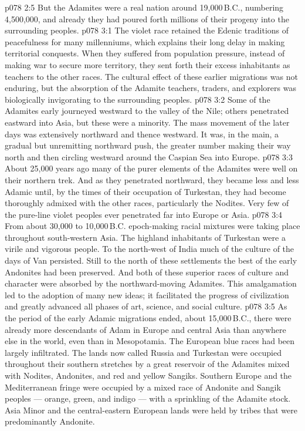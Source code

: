 \vs p078 2:5 But the Adamites were a real nation around 19,000\,B.C., numbering 4,500,000, and already they had poured forth millions of their progeny into the surrounding peoples.
\vs p078 3:1 The violet race retained the Edenic traditions of peacefulness for many millenniums, which explains their long delay in making territorial conquests. When they suffered from population pressure, instead of making war to secure more territory, they sent forth their excess inhabitants as teachers to the other races. The cultural effect of these earlier migrations was not enduring, but the absorption of the Adamite teachers, traders, and explorers was biologically invigorating to the surrounding peoples.
\vs p078 3:2 Some of the Adamites early journeyed westward to the valley of the Nile; others penetrated eastward into Asia, but these were a minority. The mass movement of the later days was extensively northward and thence westward. It was, in the main, a gradual but unremitting northward push, the greater number making their way north and then circling westward around the Caspian Sea into Europe.
\vs p078 3:3 About 25,000 years ago many of the purer elements of the Adamites were well on their northern trek. And as they penetrated northward, they became less and less Adamic until, by the times of their occupation of Turkestan, they had become thoroughly admixed with the other races, particularly the Nodites. Very few of the pure\hyp{}line violet peoples ever penetrated far into Europe or Asia.
\vs p078 3:4 From about 30,000 to 10,000\,B.C. epoch\hyp{}making racial mixtures were taking place throughout south\hyp{}western Asia. The highland inhabitants of Turkestan were a virile and vigorous people. To the north\hyp{}west of India much of the culture of the days of Van persisted. Still to the north of these settlements the best of the early Andonites had been preserved. And both of these superior races of culture and character were absorbed by the northward\hyp{}moving Adamites. This amalgamation led to the adoption of many new ideas; it facilitated the progress of civilization and greatly advanced all phases of art, science, and social culture.
\vs p078 3:5 \pc As the period of the early Adamic migrations ended, about 15,000\,B.C., there were already more descendants of Adam in Europe and central Asia than anywhere else in the world, even than in Mesopotamia. The European blue races had been largely infiltrated. The lands now called Russia and Turkestan were occupied throughout their southern stretches by a great reservoir of the Adamites mixed with Nodites, Andonites, and red and yellow Sangiks. Southern Europe and the Mediterranean fringe were occupied by a mixed race of Andonite and Sangik peoples --- orange, green, and indigo --- with a sprinkling of the Adamite stock. Asia Minor and the central\hyp{}eastern European lands were held by tribes that were predominantly Andonite.
